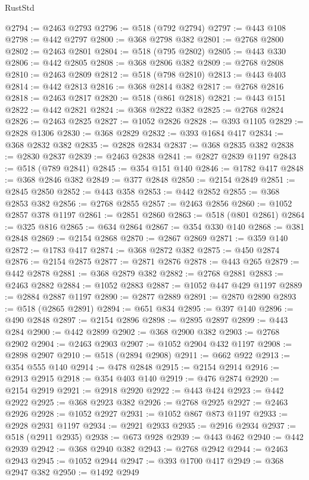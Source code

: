 \begin{lexlean}{RustStd}
\begin{coremodule}
{\begin{coremodule}
{{{{{{{{{{{{{{{{{{{{{{{{{{{{{{{{{{{{{{{{{{{{{{{{{{@2794 := @2463 @2793
@2796 := @518 (@792 @2794)
@2797 := @443 @108
@2798 := @442 @2797
@2800 := @368 @2798 @382
@2801 := @2768 @2800
@2802 := @2463 @2801
@2804 := @518 (@795 @2802)
@2805 := @443 @330
@2806 := @442 @2805
@2808 := @368 @2806 @382
@2809 := @2768 @2808
@2810 := @2463 @2809
@2812 := @518 (@798 @2810)
@2813 := @443 @403
@2814 := @442 @2813
@2816 := @368 @2814 @382
@2817 := @2768 @2816
@2818 := @2463 @2817
@2820 := @518 (@861 @2818)
@2821 := @443 @151
@2822 := @442 @2821
@2824 := @368 @2822 @382
@2825 := @2768 @2824
@2826 := @2463 @2825
@2827 := @1052 @2826
@2828 := @393 @1105
@2829 := @2828 @1306
@2830 := @368 @2829
@2832 := @393 @1684 @417
@2834 := @368 @2832 @382
@2835 := @2828 @2834
@2837 := @368 @2835 @382
@2838 := @2830 @2837
@2839 := @2463 @2838
@2841 := @2827 @2839 @1197
@2843 := @518 (@789 @2841)
@2845 := @354 @151 @140
@2846 := @1782 @417
@2848 := @368 @2846 @382
@2849 := @377 @2848
@2850 := @2154 @2849
@2851 := @2845 @2850
@2852 := @443 @358
@2853 := @442 @2852
@2855 := @368 @2853 @382
@2856 := @2768 @2855
@2857 := @2463 @2856
@2860 := @1052 @2857 @378 @1197
@2861 := @2851 @2860
@2863 := @518 (@801 @2861)
@2864 := @325 @816
@2865 := @634 @2864
@2867 := @354 @330 @140
@2868 := @381 @2848
@2869 := @2154 @2868
@2870 := @2867 @2869
@2871 := @359 @140
@2872 := @1783 @417
@2874 := @368 @2872 @382
@2875 := @450 @2874
@2876 := @2154 @2875
@2877 := @2871 @2876
@2878 := @443 @265
@2879 := @442 @2878
@2881 := @368 @2879 @382
@2882 := @2768 @2881
@2883 := @2463 @2882
@2884 := @1052 @2883
@2887 := @1052 @447 @429 @1197
@2889 := @2884 @2887 @1197
@2890 := @2877 @2889
@2891 := @2870 @2890
@2893 := @518 (@2865 @2891)
@2894 := @651 @834
@2895 := @397 @140
@2896 := @490 @2848
@2897 := @2154 @2896
@2898 := @2895 @2897
@2899 := @443 @284
@2900 := @442 @2899
@2902 := @368 @2900 @382
@2903 := @2768 @2902
@2904 := @2463 @2903
@2907 := @1052 @2904 @432 @1197
@2908 := @2898 @2907
@2910 := @518 (@2894 @2908)
@2911 := @662 @922
@2913 := @354 @555 @140
@2914 := @478 @2848
@2915 := @2154 @2914
@2916 := @2913 @2915
@2918 := @354 @403 @140
@2919 := @476 @2874
@2920 := @2154 @2919
@2921 := @2918 @2920
@2922 := @443 @424
@2923 := @442 @2922
@2925 := @368 @2923 @382
@2926 := @2768 @2925
@2927 := @2463 @2926
@2928 := @1052 @2927
@2931 := @1052 @867 @873 @1197
@2933 := @2928 @2931 @1197
@2934 := @2921 @2933
@2935 := @2916 @2934
@2937 := @518 (@2911 @2935)
@2938 := @673 @928
@2939 := @443 @462
@2940 := @442 @2939
@2942 := @368 @2940 @382
@2943 := @2768 @2942
@2944 := @2463 @2943
@2945 := @1052 @2944
@2947 := @393 @1700 @417
@2949 := @368 @2947 @382
@2950 := @1492 @2949
}}}}}}}}}}}}}}}}}}}}}}}}}}}}}}}}}}}}}}}}}}}}}}}}}}
\end{coremodule}}
\end{coremodule}
\end{lexlean}
